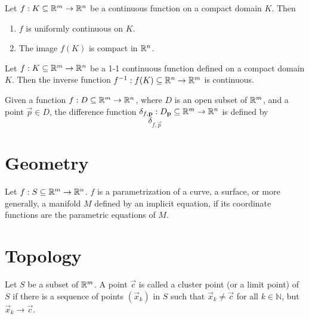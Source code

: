 \documentclass{article}
\begin{document}
\begin{theorem}
    Let $f: K \subseteq \mathbb{R}^m \rightarrow \mathbb{R}^n$ be a continuous function
    on a compact domain $K$. Then
    \begin{enumerate}
        \item $f$ is uniformly continuous on $K$.
        \item The image $f(K)$ is compact in $\mathbb{R}^n$.
    \end{enumerate}
\end{theorem}

\begin{theorem}
    Let $f: K \subseteq \mathbb{R}^m \rightarrow \mathbb{R}^n$ be a 1-1 continuous
    function defined on a compact domain $K$. Then the inverse function
    $f^{-1}: f(K) \subseteq \mathbb{R}^n \rightarrow \mathbb{R}^m$ is continuous.
\end{theorem}

\begin{definition}
    Given a function $f: D \subseteq \mathbb{R}^m \rightarrow \mathbb{R}^n$,
    where $D$ is an open subset of $\mathbb{R}^m$, and a point $\vec{p} \in D$,
    the difference function $\delta_{f, \mathbf{p}} : D_{\mathbf{p}} \subseteq \mathbb{R}^m \rightarrow \mathbb{R}^n$
    is defined by
    \begin{equation*}
        \delta_{f, \vec{p}}
    \end{equation*}
\end{definition}

\section{Geometry}
\begin{definition}[Parametrization]
    Let $f: S \subseteq \mathbb{R}^m \rightarrow \mathbb{R}^n$. $f$ is a
    parametrization of a curve, a surface, or more generally, a manifold $M$
    defined by an implicit equation, if its coordinate functions are the parametric equations
    of $M$.
\end{definition}

\section{Topology}
\begin{definition}
    Let $S$ be a subset of $\mathbb{R}^m$. A point $\vec{c}$ is
    called a cluster point (or a limit point) of $S$ if there is a
    sequence of points $(\vec{x}_k)$ in $S$ such that $\vec{x}_k \neq \vec{c}$ for
    all $k \in \mathbb{N}$, but $\vec{x}_k \rightarrow \vec{c}$.
\end{definition}
\end{document}
